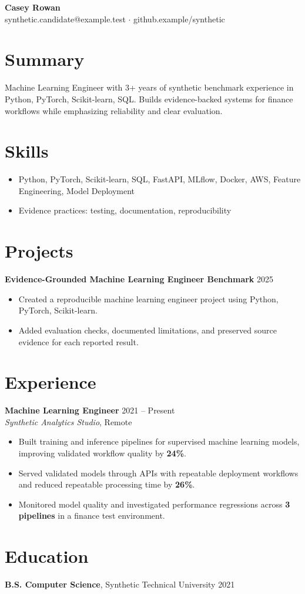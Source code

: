 \documentclass[10pt,letterpaper]{article}
\begin{document}
\begin{center}
{\Large \textbf{Casey Rowan}}\\
synthetic.candidate@example.test $\cdot$ github.example/synthetic
\end{center}

\section*{Summary}
Machine Learning Engineer with 3+ years of synthetic benchmark experience in Python, PyTorch, Scikit-learn, SQL. Builds evidence-backed systems for finance workflows while emphasizing reliability and clear evaluation.

\section*{Skills}
\begin{itemize}
  \item Python, PyTorch, Scikit-learn, SQL, FastAPI, MLflow, Docker, AWS, Feature Engineering, Model Deployment
  \item Evidence practices: testing, documentation, reproducibility
\end{itemize}

\section*{Projects}
\textbf{Evidence-Grounded Machine Learning Engineer Benchmark} \hfill 2025
\begin{itemize}
  \item Created a reproducible machine learning engineer project using Python, PyTorch, Scikit-learn.
  \item Added evaluation checks, documented limitations, and preserved source evidence for each reported result.
\end{itemize}

\section*{Experience}
\textbf{Machine Learning Engineer} \hfill 2021 -- Present\\
\textit{Synthetic Analytics Studio}, Remote
\begin{itemize}
  \item Built training and inference pipelines for supervised machine learning models, improving validated workflow quality by \textbf{24\%}.
  \item Served validated models through APIs with repeatable deployment workflows and reduced repeatable processing time by \textbf{26\%}.
  \item Monitored model quality and investigated performance regressions across \textbf{3 pipelines} in a finance test environment.
\end{itemize}

\section*{Education}
\textbf{B.S. Computer Science}, Synthetic Technical University \hfill 2021
\end{document}
